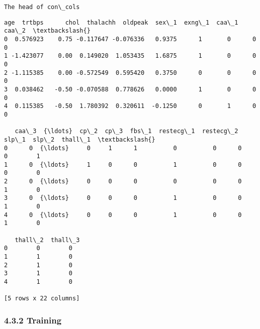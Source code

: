 \documentclass[11pt]{article}
\makeatletter
\newcommand{\boxspacing}{\kern\kvtcb@left@rule\kern\kvtcb@boxsep}
\newcommand{\prompt}[4]{
        {\ttfamily\llap{{\color{#2}[#3]:\hspace{3pt}#4}}\vspace{-\baselineskip}}
    }
\makeatother
\begin{document}
    \begin{Verbatim}[commandchars=\\\{\}]
The head of con\_cols
    \end{Verbatim}

            \begin{tcolorbox}[breakable, size=fbox, boxrule=.5pt, pad at break*=1mm, opacityfill=0]
\prompt{Out}{outcolor}{28}{\boxspacing}
\begin{Verbatim}[commandchars=\\\{\}]
        age  trtbps      chol  thalachh  oldpeak  sex\_1  exng\_1  caa\_1  caa\_2  \textbackslash{}
0  0.576923    0.75 -0.117647 -0.076336   0.9375      1       0      0      0
1 -1.423077    0.00  0.149020  1.053435   1.6875      1       0      0      0
2 -1.115385    0.00 -0.572549  0.595420   0.3750      0       0      0      0
3  0.038462   -0.50 -0.070588  0.778626   0.0000      1       0      0      0
4  0.115385   -0.50  1.780392  0.320611  -0.1250      0       1      0      0

   caa\_3  {\ldots}  cp\_2  cp\_3  fbs\_1  restecg\_1  restecg\_2  slp\_1  slp\_2  thall\_1  \textbackslash{}
0      0  {\ldots}     0     1      1          0          0      0      0        1
1      0  {\ldots}     1     0      0          1          0      0      0        0
2      0  {\ldots}     0     0      0          0          0      0      1        0
3      0  {\ldots}     0     0      0          1          0      0      1        0
4      0  {\ldots}     0     0      0          1          0      0      1        0

   thall\_2  thall\_3
0        0        0
1        1        0
2        1        0
3        1        0
4        1        0

[5 rows x 22 columns]
\end{Verbatim}
\end{tcolorbox}
        
    \hypertarget{training}{%
\subsubsection{4.3.2 Training}\label{training}}
\end{document}
